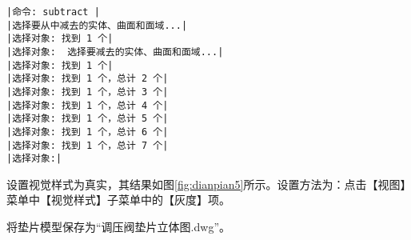 \begin{procedure}
\begin{lstlisting}
|命令: subtract |
|选择要从中减去的实体、曲面和面域...|
|选择对象: 找到 1 个|
|选择对象:  选择要减去的实体、曲面和面域...|
|选择对象: 找到 1 个|
|选择对象: 找到 1 个，总计 2 个|
|选择对象: 找到 1 个，总计 3 个|
|选择对象: 找到 1 个，总计 4 个|
|选择对象: 找到 1 个，总计 5 个|
|选择对象: 找到 1 个，总计 6 个|
|选择对象: 找到 1 个，总计 7 个|
|选择对象:|
\end{lstlisting}
\begin{figure}[htbp]
\centering
\begin{floatrow}
\hspace{30pt}
\end{floatrow}
\end{figure}
\item 设置视觉样式为真实，其结果如图\ref{fig:dianpian5}所示。设置方法为：点击【视图】菜单中【视觉样式】子菜单中的【灰度】项。
\item 将垫片模型保存为“调压阀垫片立体图.dwg”。
\end{procedure}

\endinput